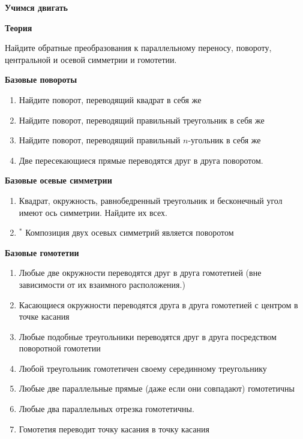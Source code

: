 \centerline{\bf \Huge Учимся двигать}
\centerline{\bf \Huge Теория}

\begin{flushright}
        \scriptsize{}
\end{flushright}

Найдите обратные преобразования к параллельному переносу, повороту, центральной и осевой симметрии и гомотетии.

\textbf{Базовые повороты}
\begin{enumerate}
    \item Найдите поворот, переводящий квадрат в себя же
    \item Найдите поворот, переводящий правильный треугольник в себя же
    \item Найдите поворот, переводящий правильный $n$-угольник в себя же
    \item Две пересекающиеся прямые переводятся друг в друга поворотом.
\end{enumerate}

\textbf{Базовые осевые симметрии}
\begin{enumerate}
    \item Квадрат, окружность, равнобедренный треугольник и бесконечный угол имеют ось симметрии. Найдите их всех.
    \item$^*$ Композиция двух осевых симметрий является поворотом
\end{enumerate}


\textbf{Базовые гомотетии}
\begin{enumerate}
    \item Любые две окружности переводятся друг в друга гомотетией (вне зависимости от их взаимного расположения.)
    \item Касающиеся окружности переводятся друга в друга гомотетией с центром в точке касания
    \item Любые подобные треугольники переводятся друг в друга посредством поворотной гомотетии
    \item Любой треугольник гомотетичен своему серединному треугольнику
    \item Любые две параллельные прямые (даже если они совпадают) гомотетичны
    \item Любые два параллельных отрезка гомотетичны.
    \item Гомотетия переводит точку касания в точку касания
\end{enumerate}


\newpage

